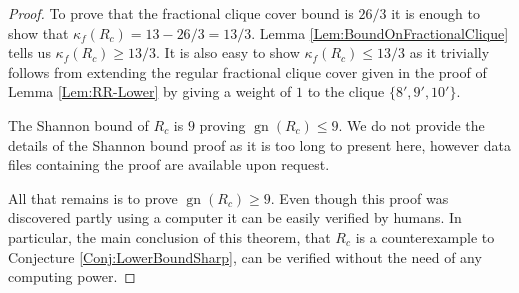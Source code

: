 \documentclass[a4paper, 14pt]{extarticle}
\theoremstyle{plain}
\DeclareMathOperator{\gn}{gn}
\begin{document}
\begin{proof}
To prove that the fractional clique cover bound is $26/3$ it is enough to show that
$\kappa_f(R_c) = 13 - 26/3 = 13/3$. Lemma \ref{Lem:BoundOnFractionalClique}
tells us $\kappa_f(R_c)\geq 13/3$. It is also easy to show
$\kappa_f(R_c)\leq 13/3$ as it trivially follows from extending the regular fractional clique cover given in the proof of Lemma
\ref{Lem:RR-Lower} by giving a weight of $1$ to the clique
$\{8',9',10'\}$.

The Shannon bound of $R_c$ is $9$ proving $\gn(R_c)\leq 9$. We do
not provide the details of the Shannon bound proof as it is too long
to present here, however data files containing the proof are
available upon request.

All that remains is to prove $\gn(R_c)\geq 9$. Even though this proof was discovered partly using a computer it can be easily verified by humans. In particular, the main conclusion of this theorem, that $R_c$ is a counterexample to Conjecture \ref{Conj:LowerBoundSharp}, can be verified without the need of any computing power. 


\end{proof}
\end{document}
